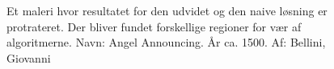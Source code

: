\begin{figure}[!h]
    \centering
    	\hspace{1em}
    	\hspace{1em}        	    			
        \caption[]{Et maleri hvor resultatet for den udvidet og den naive løsning er protrateret. Der bliver fundet forskellige regioner for vær af algoritmerne. Navn: Angel Announcing. År ca. 1500. Af: Bellini, Giovanni}
     \label{udvidet_virker3}
\end{figure}

